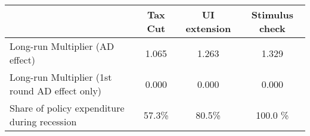\begin{tabular}{@{}lccc@{}}
\toprule
& Tax Cut    & UI extension    & Stimulus check    \\  \midrule
Long-run Multiplier (AD effect) &1.065  & 1.263  & 1.329     \\
Long-run Multiplier (1st round AD effect only) &0.000  & 0.000  & 0.000     \\
Share of policy expenditure during recession &57.3\%  & 80.5\%  & 100.0 \%    \\
\end{tabular}
